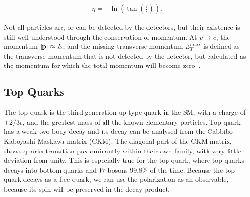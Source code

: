 \documentclass[12pt,a4paper]{article}
\numberwithin{equation}{section}
\begin{document}
\begin{align}
\label{eq:pseudorapidity}
\eta = -\ln({\tan\left(\frac{\theta}{2}\right)}).
\end{align}

Not all particles are, or can be detected by the detectors, but their existence
is still well understood through the conservation of momentum. At $v \rightarrow c$, the
momentum $\abs{\vb p} \approx E$, and the missing transverse momentum $E_T^{miss}$ is
defined as the transverse momentum that is not detected by the detector, but
calculated as the momentum for which the total momentum will become
zero~\cite{xabier}.

\subsection{Top Quarks}
The top quark is the third generation up-type quark in the SM, with a charge of
$+2/3 e$, and the greatest mass of all the known elementary particles. Top quark
has a weak two-body decay and its decay can be analysed from the
Cabbibo-Kaboyashi-Maskawa matrix (CKM). The diagonal part of the CKM matrix,
shows quarks transition predominantly within their own family, with very little
deviation from unity. This is especially true for the top quark, where top
quarks decays into bottom quarks and $W$ bosons 99.8\% of the time. Because the
top quark decays as a free quark, we can use the polarization as an observable,
because its spin will be preserved in the decay product.\\
\end{document}
